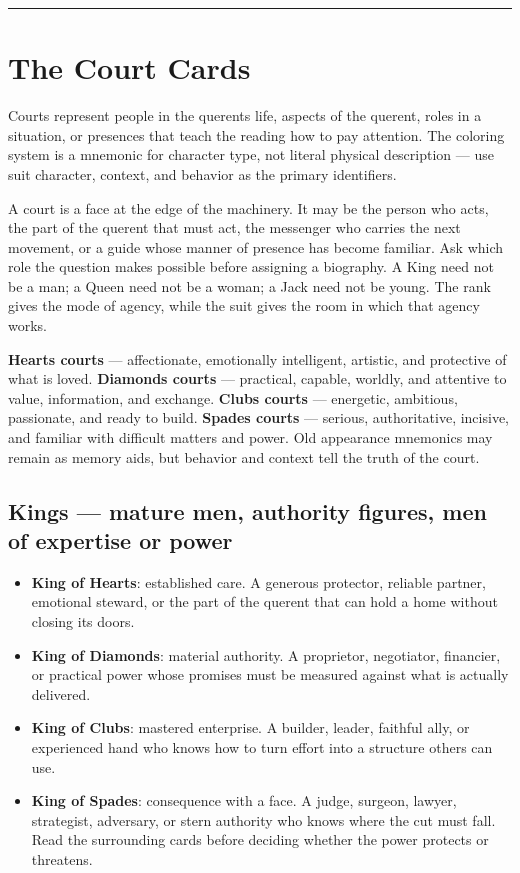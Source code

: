 \begin{center}\rule{0.5\linewidth}{0.5pt}\end{center}

\section{The Court Cards}\label{the-court-cards}

Courts represent people in the querent\textquotesingle s life, aspects of the
querent, roles in a situation, or presences that teach the reading how to pay
attention. The coloring system is a mnemonic for character type, not literal
physical description --- use suit character, context, and behavior as the
primary identifiers.

A court is a face at the edge of the machinery. It may be the person who acts,
the part of the querent that must act, the messenger who carries the next
movement, or a guide whose manner of presence has become familiar. Ask which
role the question makes possible before assigning a biography. A King need not
be a man; a Queen need not be a woman; a Jack need not be young. The rank gives
the mode of agency, while the suit gives the room in which that agency works.

\textbf{Hearts courts} --- affectionate, emotionally intelligent, artistic, and
protective of what is loved. \textbf{Diamonds courts} --- practical, capable,
worldly, and attentive to value, information, and exchange. \textbf{Clubs courts}
--- energetic, ambitious, passionate, and ready to build. \textbf{Spades courts}
--- serious, authoritative, incisive, and familiar with difficult matters and
power. Old appearance mnemonics may remain as memory aids, but behavior and
context tell the truth of the court.

\subsection{Kings --- mature men, authority figures, men of expertise or power}\label{kings--mature-men-authority-figures-men-of-expertise-or-power}

\begin{itemize}
\tightlist
\item
  \textbf{King of Hearts}: established care. A generous protector, reliable
  partner, emotional steward, or the part of the querent that can hold a home
  without closing its doors.
\item
  \textbf{King of Diamonds}: material authority. A proprietor, negotiator,
  financier, or practical power whose promises must be measured against what is
  actually delivered.
\item
  \textbf{King of Clubs}: mastered enterprise. A builder, leader, faithful ally,
  or experienced hand who knows how to turn effort into a structure others can
  use.
\item
  \textbf{King of Spades}: consequence with a face. A judge, surgeon, lawyer,
  strategist, adversary, or stern authority who knows where the cut must fall.
  Read the surrounding cards before deciding whether the power protects or
  threatens.
\end{itemize}

